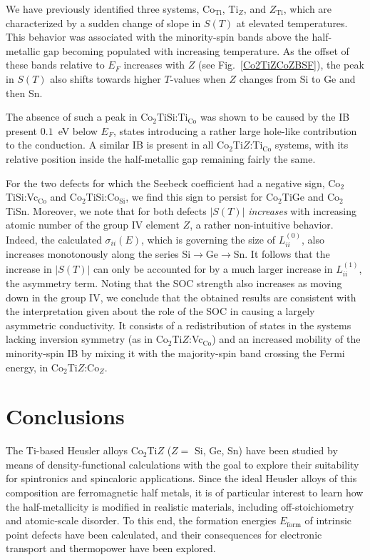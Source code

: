 \documentclass[aps,prb,twocolumn,superscriptaddress,showpacs]{revtex4}
\newcommand{\FG}[1]{Fig.~\ref{#1}}
\begin{document}
We have previously identified three systems,
Co$_\text{Ti}$, Ti$_Z$, and $Z_\text{Ti}$, 
which are characterized by a sudden change of slope in $S(T)$ at
elevated temperatures. 
This behavior was associated with
the minority-spin bands above the half-metallic gap 
becoming populated with increasing temperature. As the
offset of these bands relative to $E_F$ increases with 
$Z$ (see \FG{Co2TiZCoZBSF}), the peak in $S(T)$ 
also shifts towards higher $T$-values when $Z$ changes
from Si to Ge and then Sn. 

The absence of such a peak in Co$_2$TiSi:Ti$_\text{Co}$ was shown to
be caused by the IB present $0.1$~eV below $E_F$, states introducing a
rather large hole-like contribution to the conduction. A similar IB is
present in all Co$_2$Ti$Z$:Ti$_\text{Co}$ systems, with its relative
position inside the half-metallic gap remaining fairly the same.

For the two defects for which the Seebeck coefficient
had a negative sign, Co$_2$TiSi:Vc$_\text{Co}$ and 
Co$_2$TiSi:Co$_\text{Si}$, we find this sign to persist
for Co$_2$TiGe and Co$_2$TiSn.
Moreover, we note that for both defects $|S(T)|$ {\em increases} 
with increasing atomic number of the group IV element $Z$,
a rather non-intuitive behavior. 
Indeed, the calculated $\sigma_{ii}(E)$, 
which is governing the size of $L_{ii}^{(0)}$, also increases 
monotonously along the series Si$\to$Ge$\to$Sn. 
It follows that the increase in $|S(T)|$ can only be accounted for 
by a much larger increase in $L_{ii}^{(1)}$, the asymmetry term.
Noting that the SOC strength  also 
increases as moving down in the group IV, we conclude
that the obtained results are consistent with the 
interpretation given about the role of the SOC in 
causing a largely asymmetric conductivity.
It consists of a redistribution of states in the
systems lacking inversion symmetry (as in
Co$_2$Ti$Z$:Vc$_\text{Co}$) and an increased
mobility of the minority-spin IB by mixing it
with the majority-spin band crossing the Fermi energy,
in Co$_2$Ti$Z$:Co$_Z$.

\section{Conclusions}

The Ti-based Heusler alloys Co$_2$Ti$Z$ ($Z=$ Si, Ge, Sn) have been
studied by means of density-functional calculations with the goal to
explore their suitability for spintronics and spincaloric
applications. Since the ideal Heusler alloys of this composition are
ferromagnetic half metals, it is of particular interest to learn how
the half-metallicity is modified in realistic materials, including
off-stoichiometry and atomic-scale disorder. To this end, the formation
energies $E_\text{form}$ of intrinsic point defects have been
calculated, and their consequences for electronic transport and
thermopower have been explored.  
\end{document}
